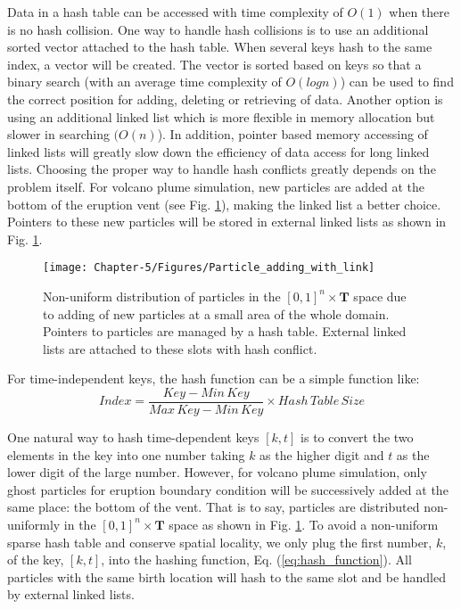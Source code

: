 Data in a hash table can be accessed with time complexity of $O(1)$ when there is no hash collision. One way to handle hash collisions is to use an additional sorted vector attached to the hash table. When several keys hash to the same index, a vector will be created. The vector is sorted based on keys so that a binary search (with an average time complexity of $O(log n)$) can be used to find the correct position for adding, deleting or retrieving of data. Another option is using an additional linked list which is more flexible in memory allocation but slower in searching $(O(n)$). In addition, pointer based memory accessing of linked lists will greatly slow down the efficiency of data access for long linked lists. Choosing the proper way to handle hash conflicts greatly depends on the problem itself. For volcano plume simulation, new particles are added at the bottom of the eruption vent (see Fig. \ref{fig:Particle_adding_with_link}), making the linked list a better choice. Pointers to these new particles will be stored in external linked lists as shown in Fig. \ref{fig:Particle_adding_with_link}.
\begin{figure}
\centering
{\texttt{[image: Chapter-5/Figures/Particle\_adding\_with\_link]}}
{\caption{Non-uniform distribution of particles in the $[0,1]^n \times \textbf{T}$ space due to adding of new particles at a small area of the whole domain. Pointers to particles are managed by a hash table. External linked lists are attached to these slots with hash conflict.}
\label{fig:Particle_adding_with_link}}
\end{figure}

For time-independent keys, the hash function can be a simple function like:
\begin{equation}
Index= \frac{Key - Min\,Key}{Max\,Key - Min\,Key} 
\times Hash\,Table\,Size 
\label{eq:hash_function}
\end{equation}

One natural way to hash time-dependent keys $[k,t]$ is to convert the two elements in the key into one number taking $k$ as the higher digit and $t$ as the lower digit of the large number. However, for volcano plume simulation, only ghost particles for eruption boundary condition will be successively added at the same place: the bottom of the vent. That is to say, particles are distributed non-uniformly in the $[0,1]^n \times \textbf{T}$ space as shown in Fig. \ref{fig:Particle_adding_with_link}. To avoid a non-uniform sparse hash table and conserve spatial locality, we only plug the first number, $k$, of the key, $[k,t]$, into the hashing function, Eq. (\ref{eq:hash_function}). All particles with the same birth location will hash to the same slot and be handled by external linked lists.

